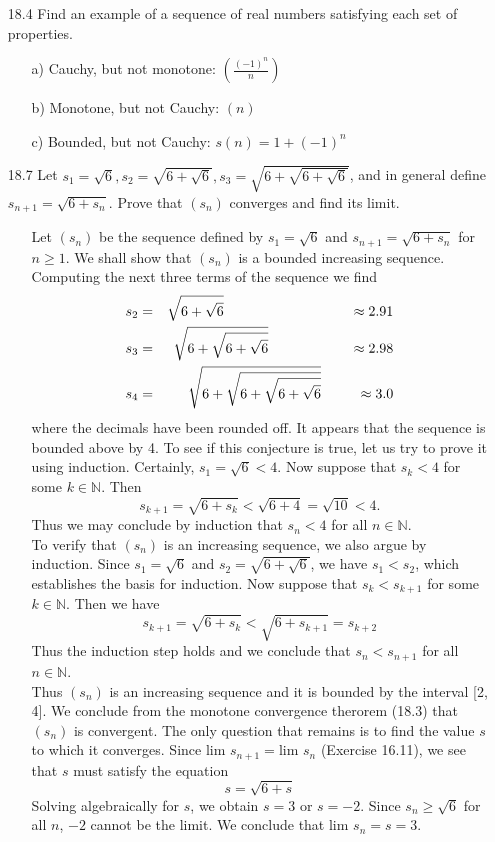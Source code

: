 \documentclass[12pt]{article}
\begin{document}
\begin{enumerate}
\item[18.4] Find an example of a sequence of real numbers satisfying each set of properties.
\begin{enumerate}
\item[a)] Cauchy, but not monotone: {\large $\left( \frac{(-1)^n}{n} \right)$}
\item[b)] Monotone, but not Cauchy: $(n)$
\item[c)] Bounded, but not Cauchy: $s(n) = 1 + (-1)^n$
\end{enumerate}

\item[18.7] Let $s_1 = \sqrt{6}, s_2 = \sqrt{6 + \sqrt{6}}, s_3 = \sqrt{6 + \sqrt{6 + \sqrt{6}}}$,
and in general define $s_{n+1} = \sqrt{6 + s_n}$. Prove that $(s_n)$ converges and find its limit.
\begin{enumerate}
\item[] Let $(s_n)$ be the sequence defined by $s_1 = \sqrt{6}$ and 
$s_{n + 1} = \sqrt{6 + s_n}$ for $n \geq 1$. We shall show that $(s_n)$ is a
bounded increasing sequence. Computing the next three terms of the sequence we find
\begin{eqnarray*}
s_2 &=& \sqrt{6 + \sqrt{6}} \hskip 3.17cm \approx 2.91 \\
s_3 &=& \sqrt{6 + \sqrt{6 + \sqrt{6}}} \hskip 2.05cm \approx 2.98 \\
s_4 &=& \sqrt{6 + \sqrt{6 + \sqrt{6 + \sqrt{6}}}} \hskip 0.9cm \approx 3.0
\end{eqnarray*}
where the decimals have been rounded off. It appears that the sequence is bounded
above by 4. To see if this conjecture is true, let us try to prove it using 
induction. Certainly, $s_1 = \sqrt{6} < 4$. Now suppose that $s_k < 4$ for 
some $k \in \mathbb{N}$. Then
\[
s_{k + 1} = \sqrt{6 + s_k} < \sqrt{6 + 4} = \sqrt{10} < 4.
\]
Thus we may conclude by induction that $s_n < 4$ for all $n \in \mathbb{N}$. \\
To verify that $(s_n)$ is an increasing sequence, we also argue by induction.
Since $s_1 = \sqrt{6}$ and $s_2 = \sqrt{6 + \sqrt{6}}$, we have $s_1 < s_2$, which
establishes the basis for induction. Now suppose that $s_k < s_{k + 1}$ for some
$k \in \mathbb{N}$. Then we have
\[
s_{k + 1} = \sqrt{6 + s_k} < \sqrt{6 + s_{k + 1}} = s_{k + 2}
\]
Thus the induction step holds and we conclude that $s_n < s_{n + 1}$ for all 
$n \in \mathbb{N}$. \\
Thus $(s_n)$ is an increasing sequence and it is bounded by the interval [2, 4].
We conclude from the monotone convergence therorem (18.3) that $(s_n)$ is 
convergent. The only question that remains is to find the value $s$ to which
it converges. Since lim $s_{n + 1} = $lim $s_n$ (Exercise 16.11), we see that $s$
must satisfy the equation 
\[
s = \sqrt{6 + s}
\]
Solving algebraically for $s$, we obtain $s = 3$ or $s = -2$. Since $s_n \geq \sqrt{6}$
for all $n$, $-2$ cannot be the limit. We conclude that lim $s_n = s = 3$.
\end{enumerate}



\end{enumerate}
\end{document}
